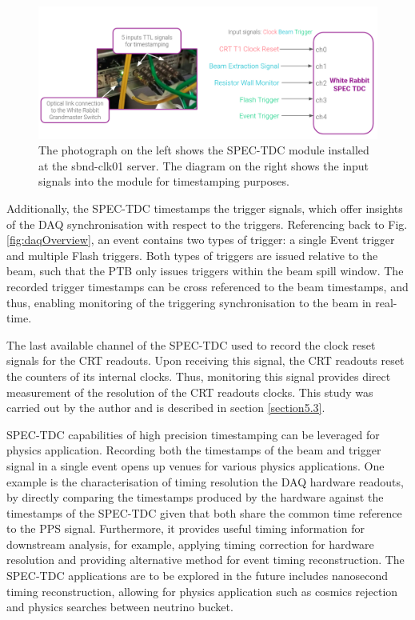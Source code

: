 \begin{figure}[htbp!] 
\centering    
\includegraphics[width=1.0\textwidth]{SPEC_TDC}
\caption[SPECTDC]{
The photograph on the left shows the SPEC-TDC module installed at the sbnd-clk01 server.
The diagram on the right shows the input signals into the module for timestamping purposes.
}
\label{fig:SPECTDC}
\end{figure}

Additionally, the SPEC-TDC timestamps the trigger signals, which offer insights of the DAQ synchronisation with respect to the triggers. 
Referencing back to Fig. \ref{fig:daqOverview}, an event contains two types of trigger: a single Event trigger and multiple Flash triggers. 
Both types of triggers are issued relative to the beam, such that the PTB only issues triggers within the beam spill window.   
The recorded trigger timestamps can be cross referenced to the beam timestamps, and thus, enabling monitoring of the triggering synchronisation to the beam in real-time.

The last available channel of the SPEC-TDC used to record the clock reset signals for the CRT readouts. 
Upon receiving this signal, the CRT readouts reset the counters of its internal clocks.
Thus, monitoring this signal provides direct measurement of the resolution of the CRT readouts clocks.
This study was carried out by the author and is described in section \ref{section5.3}.

SPEC-TDC capabilities of high precision timestamping can be leveraged for physics application.
Recording both the timestamps of the beam and trigger signal in a single event opens up venues for various physics applications. 
One example is the characterisation of timing resolution the DAQ hardware readouts, by directly comparing the timestamps produced by the hardware against the timestamps of the SPEC-TDC given that both share the common time reference to the PPS signal.
Furthermore, it provides useful timing information for downstream analysis, for example, applying timing correction for hardware resolution and providing alternative method for event timing reconstruction. 
The SPEC-TDC applications are to be explored in the future includes nanosecond timing reconstruction, allowing for physics application such as cosmics rejection and physics searches between neutrino bucket.

